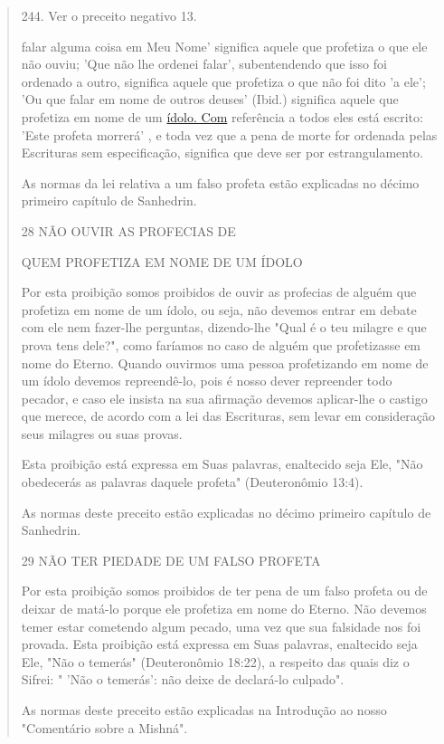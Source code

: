 \begin{quote}
244. Ver o preceito negativo 13.

falar alguma coisa em Meu Nome' significa aquele que profetiza o que ele
não ouviu; 'Que não lhe ordenei falar', subentendendo que isso foi
ordenado a ou­tro, significa aquele que profetiza o que não foi dito 'a
ele'; 'Ou que falar em nome de outros deuses' (Ibid.) significa aquele
que profetiza em nome de um \href{http://ídolo.Com}{{ídolo. Com}}
referência a todos eles está escrito: 'Este profeta morrerá' , e toda
vez que a pena de morte for ordenada pelas Escrituras sem especificação,
signi­fica que deve ser por estrangulamento.

As normas da lei relativa a um falso profeta estão explicadas no déci­mo
primeiro capítulo de Sanhedrin.

28 NÃO OUVIR AS PROFECIAS DE

QUEM PROFETIZA EM NOME DE UM ÍDOLO

Por esta proibição somos proibidos de ouvir as profecias de alguém que
profetiza em nome de um ídolo, ou seja, não devemos entrar em debate com
ele nem fazer-lhe perguntas, dizendo-lhe "Qual é o teu milagre e que
pro­va tens dele?", como faríamos no caso de alguém que profetizasse em
nome do Eterno. Quando ouvirmos uma pessoa profetizando em nome de um
ídolo devemos repreendê-lo, pois é nosso dever repreender todo pecador,
e caso ele insista na sua afirmação devemos aplicar-lhe o castigo que
merece, de acordo com a lei das Escrituras, sem levar em consideração
seus milagres ou suas provas.

Esta proibição está expressa em Suas palavras, enaltecido seja Ele, "Não
obedecerás as palavras daquele profeta" (Deuteronômio 13:4).

As normas deste preceito estão explicadas no décimo primeiro capí­tulo
de Sanhedrin.

29 NÃO TER PIEDADE DE UM FALSO PROFETA

Por esta proibição somos proibidos de ter pena de um falso profeta ou de
deixar de matá-lo porque ele profetiza em nome do Eterno. Não deve­mos
temer estar cometendo algum pecado, uma vez que sua falsidade nos foi
provada. Esta proibição está expressa em Suas palavras, enaltecido seja
Ele, "Não o temerás" (Deuteronômio 18:22), a respeito das quais diz o
Sifrei: " 'Não o temerás': não deixe de declará-lo culpado".

As normas deste preceito estão explicadas na Introdução ao nosso
"Comentário sobre a Mishná".


\end{quote}
